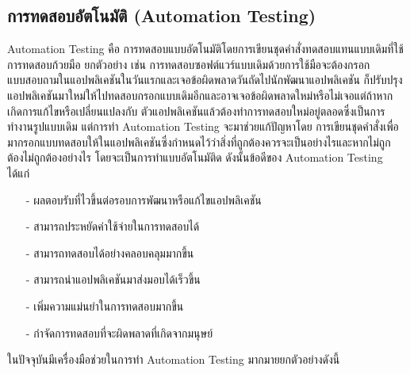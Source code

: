     \subsection{การทดสอบอัตโนมัติ (Automation Testing)}
        Automation Testing คือ การทดสอบแบบอัตโนมัติโดยการเขียนชุดคำสั่งทดสอบแทนแบบเดิมที่ใช้การทดสอบก้วยมือ ยกตัวอย่าง เช่น
        การทดสอบซอฟต์แวร์แบบเดิมด้วยการใช้มือจะต้องกรอกแบบสอบถามในแอปพลิเคชันในวันแรกและเจอข้อผิดพลาดวันถัดไปนักพัฒนาแอปพลิเคชัน
        ก็ปรับปรุงแอปพลิเคชันมาใหม่ให้ไปทดสอบกรอกแบบเดิมอีกและอาจเจอข้อผิดพลาดใหม่หรือไม่เจอแต่ถ้าหากเกิดการแก้ไขหรือเปลี่ยนแปลงกับ
        ตัวแอปพลิเคชันแล้วต้องทำการทดสอบใหม่อยู่ตลอดซึ่งเป็นการทำงานรูปแบบเดิม แต่การทำ Automation Testing จะมาช่วยแก้ปัญหาโดย
        การเขียนชุดคำสั่งเพื่อมากรอกแบบทดสอบให้ในแอปพลิเคชันซึ่งกำหนดไว้ว่าสิ่งที่ถูกต้องควรจะเป็นอย่างไรและหากไม่ถูกต้องไม่ถูกต้องอย่างไร
        โดยจะเป็นการทำแบบอัตโนมัติด ดังนั้นข้อดีของ Automation Testing ได้แก่
        \begin{itemize}
            \item[-] ผลตอบรับที่ไวขึ้นต่อรอบการพัฒนาหรือแก้ไขแอปพลิเคชัน
            \item[-] สามารถประหยัดค่าใช้จ่ายในการทดสอบได้
            \item[-] สามารถทดสอบได้อย่างคลอบคลุมมากขึ้น
            \item[-] สามารถนำแอปพลิเคชันมาส่งมอบได้เร็วขึ้น
            \item[-] เพิ่มความแม่นยำในการทดสอบมากขึ้น 
            \item[-] กำจัดการทดสอบที่จะผิดพลาดที่เกิดจากมนุษย์ 
        \end{itemize}
        ในปัจจุบันมีเครื่องมือช่วยในการทำ Automation Testing มากมายยกตัวอย่างดังนี้
